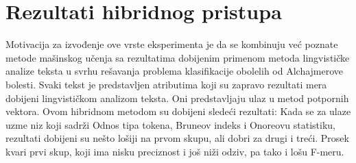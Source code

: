 \documentclass[12pt,oneside]{memoir}
\begin{document}
\section{Rezultati hibridnog pristupa }

Motivacija za izvođenje ove vrste eksperimenta je da se kombinuju već poznate metode mašinskog učenja sa rezultatima dobijenim primenom metoda lingvističke analize teksta u svrhu rešavanja problema klasifikacije obolelih od Alchajmerove bolesti. 
\newpage
\noindent
Svaki tekst je predstavljen atributima koji su zapravo rezultati mera dobijeni lingvističkom analizom teksta. Oni predstavljaju ulaz u metod potpornih vektora. Ovom hibridnom metodom su dobijeni sledeći rezultati:
\newline
\newline
\noindent{}
\newline
\newline
\noindent
Kada se za ulaze uzme niz koji sadrži Odnos tipa tokena, Bruneov indeks i Onoreovu statistiku, rezultati dobijeni su nešto lošiji na prvom skupu, ali dobri za drugi i treći.  Prosek kvari prvi skup, koji ima nisku preciznost i još niži odziv,  pa tako i lošu F-meru.
\newline
\end{document}
